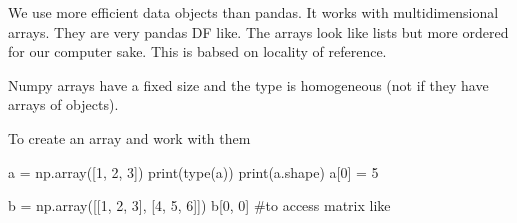 We use more efficient data objects than pandas. It works with multidimensional arrays. They are very pandas DF like. 
The arrays look like lists but more ordered for our computer sake. This is babsed on locality of reference.

\vspace{10pt}

Numpy arrays have a fixed size and the type is homogeneous (not if they have arrays of objects).

\vspace{10pt}

To create an array and work with them

\begin{pythoncode}
    a = np.array([1, 2, 3])
    print(type(a))
    print(a.shape)
    a[0] = 5

    b = np.array([[1, 2, 3], [4, 5, 6]])
    b[0, 0] #to access matrix like
\end{pythoncode}